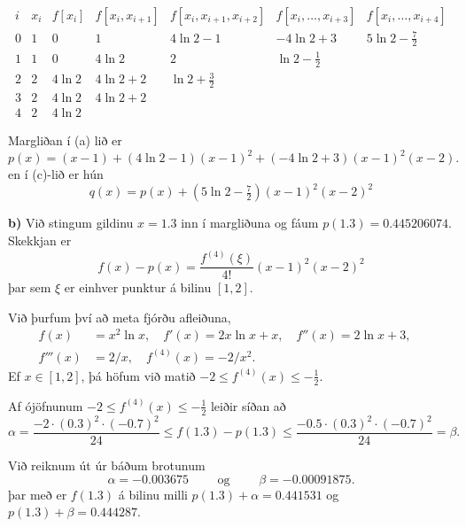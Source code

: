 \documentclass[icelandic,a4paper,12pt]{article}
\begin{document}
$$
\begin{matrix}
i&x_i & f[x_i] &f[x_i,x_{i+1}] & f[x_i,x_{i+1},x_{i+2}] &
f[x_i,\dots,x_{i+3}]&f[x_i,\dots,x_{i+4}] \\\hline
0&1&0     &1       &4\ln 2-1        &-4\ln 2+3& 5\ln 2-\tfrac 72\\
1&1&0     &4\ln 2  &2               &\ln 2-\tfrac 12\\
2&2&4\ln 2&4\ln 2+2&\ln 2+\tfrac 32\\
3&2&4\ln 2&4\ln 2+2\\
4&2&4\ln 2
\end{matrix}
$$

\pause
Margliðan í (a) lið er  
$$p(x)=(x-1)+(4\ln 2-1)(x-1)^2+(-4\ln 2+3)(x-1)^2(x-2).
$$
en í (c)-lið er hún
$$
q(x)=p(x)+(5\ln 2-\tfrac 72)(x-1)^2(x-2)^2
$$


{\bf b)}  Við stingum gildinu $x=1.3$ inn í margliðuna og fáum
 $p(1.3)=0.445206074$. Skekkjan er
$$
f(x)-p(x)=\dfrac{f^{(4)}(\xi)}{4!}(x-1)^2(x-2)^2
$$ 
þar sem $\xi$ er einhver punktur á bilinu $[1,2]$.

\pause
\smallskip  
Við þurfum því að meta fjórðu afleiðuna,
\begin{align*}
f(x) &=x^2\ln x, \quad
f'(x)=2x\ln x+x, \quad
f''(x)=2\ln x+3, \quad
\\  
f'''(x)& =2/x, \quad
f^{(4)}(x)=-2/x^2.
\end{align*}
Ef $x\in [1,2]$, þá höfum við matið
$-2\leq f^{(4)}(x)\leq -\tfrac 12$. 


Af ójöfnunum  $-2\leq f^{(4)}(x)\leq -\tfrac 12$
leiðir síðan að
$$
\alpha=\dfrac{-2\cdot(0.3)^2\cdot(-0.7)^2}{24}\leq f(1.3)-p(1.3)
\leq \dfrac{-0.5\cdot(0.3)^2\cdot(-0.7)^2}{24}=\beta.
$$

\pause
\smallskip
 Við reiknum út úr báðum brotunum
$$\alpha=-0.003675 \qquad \text{ og } \qquad 
\beta=-0.00091875.
$$
þar með er $f(1.3)$ á bilinu milli 
$p(1.3)+\alpha=0.441531$ og $p(1.3)+\beta=0.444287$.
\end{document}
